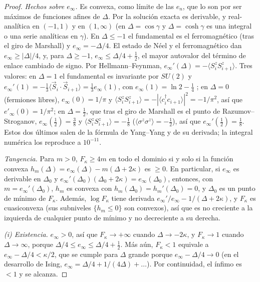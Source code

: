 \documentclass[11pt,a4paper]{article}
\theoremstyle{remark}
\newcommand{\ev}[1]{\langle #1\rangle}
\begin{document}
\begin{proof}
\emph{Hechos sobre $e_\infty$.} Es convexa, como límite de las $e_n$, que lo son por ser máximos de
funciones afines de $\Delta$. Por la solución exacta \cite{yang-yang} es derivable, y
real-analítica en $(-1,1)$ y en $(1,\infty)$ (en $\Delta=\cos\gamma$ y $\Delta=\cosh\gamma$ es una
integral o una serie analíticas en $\gamma$). En $\Delta\le-1$ el fundamental es el ferromagnético
(tras el giro de Marshall) y $e_\infty=-\Delta/4$. El estado de Néel y el ferromagnético dan
$e_\infty\ge|\Delta|/4$, y, para $\Delta\ge-1$, $e_\infty\le\Delta/4+\tfrac12$, el mayor autovalor
del término de enlace cambiado de signo. Por Hellmann--Feynman, $e_\infty'(\Delta)=-\ev{S^z_iS^z_{i+1}}$. Tres
valores: en $\Delta=1$ el fundamental es invariante por $SU(2)$ y
$e_\infty'(1)=-\tfrac13\ev{\vec S_i\cdot\vec S_{i+1}}=\tfrac13e_\infty(1)$, con
$e_\infty(1)=\ln2-\tfrac14$ \cite{hulthen}; en $\Delta=0$ (fermiones libres), $e_\infty(0)=1/\pi$
y $\ev{S^z_iS^z_{i+1}}=-|\ev{c_i^\dagger c_{i+1}}|^2=-1/\pi^2$, así que $e'_\infty(0)=1/\pi^2$; en
$\Delta=\tfrac12$, que tras el giro de Marshall es el punto de Razumov--Stroganov,
$e_\infty(\tfrac12)=\tfrac38$ y $\ev{S^z_iS^z_{i+1}}=-\tfrac18$ ($\ev{\sigma^z\sigma^z}=-\tfrac12$), así
que $e_\infty'(\tfrac12)=\tfrac18$. Estos dos últimos salen de la fórmula de Yang--Yang y de su
derivada; la integral numérica los reproduce a $10^{-11}$.

\emph{Tangencia.} Para $m>0$, $F_\kappa\ge4m$ en todo el dominio si y solo si la función convexa
$h_m(\Delta)=e_\infty(\Delta)-m(\Delta+2\kappa)$ es $\ge0$. En particular, si $e_\infty$ es
derivable en $\Delta_0$ y $e_\infty'(\Delta_0)(\Delta_0+2\kappa)=e_\infty(\Delta_0)$, entonces, con
$m=e_\infty'(\Delta_0)$, $h_m$ es convexa con $h_m(\Delta_0)=h_m'(\Delta_0)=0$, y $\Delta_0$ es un
punto de mínimo de $F_\kappa$. Además, $\log F_\kappa$ tiene derivada
$e_\infty'/e_\infty-1/(\Delta+2\kappa)$, y $F_\kappa$ es cuasiconvexa (sus subniveles
$\{h_m\le0\}$ son convexos), así que es no creciente a la izquierda de cualquier punto de mínimo y
no decreciente a su derecha.

\emph{(i) Existencia.} $e_\infty>0$, así que $F_\kappa\to+\infty$ cuando $\Delta\to-2\kappa$, y
$F_\kappa\to1$ cuando $\Delta\to\infty$, porque $\Delta/4\le e_\infty\le\Delta/4+\tfrac12$. Más aún,
$F_\kappa<1$ equivale a $e_\infty-\Delta/4<\kappa/2$, que se cumple para $\Delta$ grande
porque $e_\infty-\Delta/4\to0$ (en el desarrollo de Ising, $e_\infty=\Delta/4+1/(4\Delta)+\dots$).
Por continuidad, el ínfimo es $<1$ y se alcanza.


\end{proof}
\end{document}
